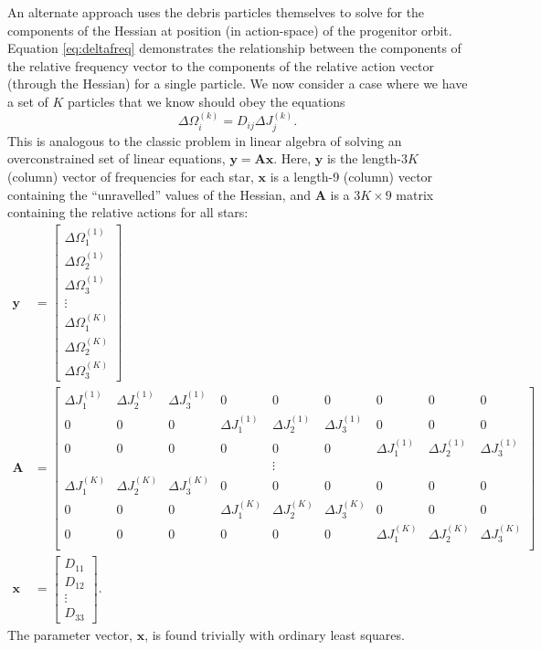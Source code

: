 \documentclass[letterpaper,12pt,preprint]{aastex}
\begin{document}
An alternate approach uses the debris particles themselves to solve for the components of the Hessian at position (in action-space) of the progenitor orbit. Equation \ref{eq:deltafreq} demonstrates the relationship between the components of the relative frequency vector to the components of the relative action vector (through the Hessian) for a single particle. We now consider a case where we have a set of $K$ particles that we know should obey the equations
\begin{equation}
	\Delta\Omega_i^{(k)} = D_{ij}\Delta J_j^{(k)}.
\end{equation}
This is analogous to the classic problem in linear algebra of solving an overconstrained set of linear equations, $\mathbf{y} = \mathbf{A}\mathbf{x}$. Here, $\mathbf{y}$ is the length-$3K$ (column) vector of frequencies for each star, $\mathbf{x}$ is a length-9 (column) vector containing the ``unravelled'' values of the Hessian, and $\mathbf{A}$ is a $3K\times 9$ matrix containing the relative actions for all stars:
\begin{align}
	\mathbf{y} &= \left[ \begin{array}{c} 
					\Delta\Omega_1^{(1)} \\ \Delta\Omega_2^{(1)} \\ \Delta\Omega_3^{(1)} \\ \vdots \\ 
					\Delta\Omega_1^{(K)} \\ \Delta\Omega_2^{(K)} \\ \Delta\Omega_3^{(K)}
				\end{array} \right]\\
	\mathbf{A} &= \begin{bmatrix} 
					\Delta J_1^{(1)} & \Delta J_2^{(1)} & \Delta J_3^{(1)} & 0 & 0 & 0 & 0 & 0 & 0  \\
					0 & 0 & 0 & \Delta J_1^{(1)} & \Delta J_2^{(1)} & \Delta J_3^{(1)} & 0 & 0 & 0  \\
					0 & 0 & 0 & 0 & 0 & 0 & \Delta J_1^{(1)} & \Delta J_2^{(1)} & \Delta J_3^{(1)}  \\
					&&&&\vdots \\
					\Delta J_1^{(K)} & \Delta J_2^{(K)} & \Delta J_3^{(K)} & 0 & 0 & 0 & 0 & 0 & 0  \\
					0 & 0 & 0 & \Delta J_1^{(K)} & \Delta J_2^{(K)} & \Delta J_3^{(K)} & 0 & 0 & 0  \\
					0 & 0 & 0 & 0 & 0 & 0 & \Delta J_1^{(K)} & \Delta J_2^{(K)} & \Delta J_3^{(K)}  \\
			       \end{bmatrix}\\
	\mathbf{x} &= \left[ \begin{array}{c} D_{11} \\ D_{12} \\ \vdots \\ D_{33} \end{array} \right].
\end{align}
The parameter vector, $\mathbf{x}$, is found trivially with ordinary least squares.
\end{document}

